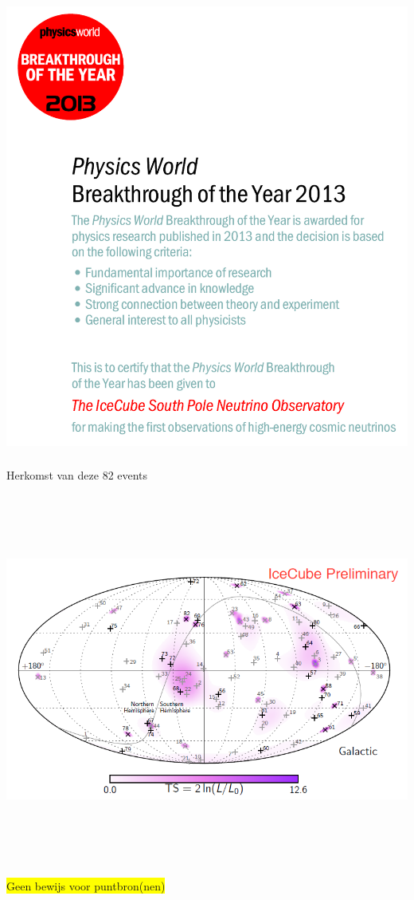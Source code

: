 \Tr
\onecolumn
\begin{center}
\includegraphics[keepaspectratio,height=15cm]{breakthrough}\\
\end{center}

\Tr
\onecolumn
\begin{center}
{\blue Herkomst van deze 82 events}\\[5mm]
\includegraphics[keepaspectratio,height=13cm]{hese-skymap-gal-6yr}\\
\colorbox{yellow}{Geen bewijs voor puntbron(nen)}
\end{center}
